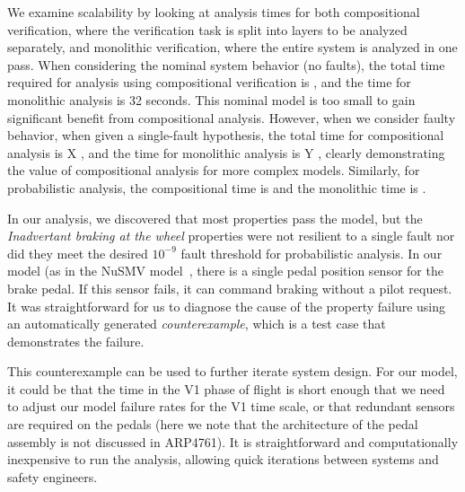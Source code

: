 We examine scalability by looking at analysis times for both compositional verification, where the verification task is split into layers to be analyzed separately, and monolithic verification, where the entire system is analyzed in one pass.  When considering the nominal system behavior (no faults), the total time required for analysis using compositional verification is , and the time for monolithic analysis is 32 seconds.  This nominal model is too small to gain significant benefit from compositional analysis.  However, when we consider faulty behavior, when given a single-fault hypothesis, the total time for compositional analysis is X , and the time for monolithic analysis is Y , clearly demonstrating the value of compositional analysis for more complex models.  Similarly, for probabilistic analysis, the compositional time is  and the monolithic time is .

In our analysis, we discovered that most properties pass the model, but the \textit{Inadvertant braking at the wheel} properties were not resilient to a single fault nor did they meet the desired $10^{-9}$ fault threshold for probabilistic analysis.  In our model (as in the NuSMV model~\cite{DBLP:conf/cav/BozzanoCPJKPRT15}, there is a single pedal position sensor for the brake pedal.  If this sensor fails, it can command braking without a pilot request.  It was straightforward for us to diagnose the cause of the property failure using an automatically generated {\em counterexample}, which is a test case that demonstrates the failure.

This counterexample can be used to further iterate system design.  For our model, it could be that the time in the V1 phase of flight is short enough that we need to adjust our model failure rates for the V1 time scale, or that redundant sensors are required on the pedals (here we note that the architecture of the pedal assembly is not discussed in ARP4761).  It is straightforward and computationally inexpensive to run the analysis, allowing quick iterations between systems and safety engineers. 


